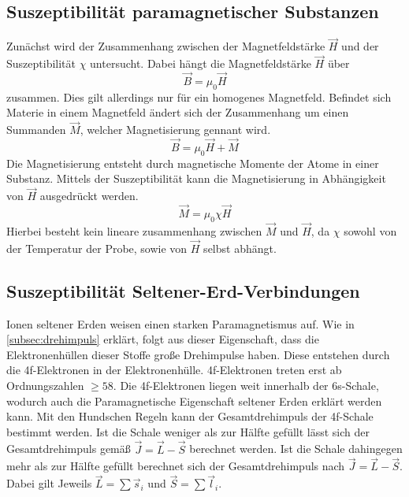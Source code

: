 \subsection{Suszeptibilität paramagnetischer Substanzen}
\label{subsec:Berechnung}

Zunächst wird der Zusammenhang zwischen der Magnetfeldstärke $\vec{H}$ und der Suszeptibilität $\chi$ untersucht. Dabei hängt die Magnetfeldstärke $\vec{H}$ über 
\begin{equation*}
    \vec{B} = \mu_0 \vec{H}
\end{equation*}
zusammen. Dies gilt allerdings nur für ein homogenes Magnetfeld. Befindet sich Materie in einem Magnetfeld ändert sich der Zusammenhang um einen Summanden $\vec{M}$, welcher 
Magnetisierung gennant wird.
\begin{equation}
    \label{eqn:magnetfeld}
    \vec{B} = \mu_0 \vec{H} + \vec{M}
\end{equation}
Die Magnetisierung entsteht durch magnetische Momente der Atome in einer Substanz. Mittels der Suszeptibilität kann die Magnetisierung in Abhängigkeit von $\vec{H}$
ausgedrückt werden. 
\begin{equation}
    \label{eqn:Mchi}
    \vec{M} = \mu_0 \chi \vec{H}
\end{equation}
Hierbei besteht kein lineare zusammenhang zwischen $\vec{M}$ und $\vec{H}$, da $\chi$ sowohl von der Temperatur der Probe, sowie von $\vec{H}$ selbst abhängt.

\subsection{Suszeptibilität Seltener-Erd-Verbindungen}
\label{subsec:suzepseltenererden}
Ionen seltener Erden weisen einen starken Paramagnetismus auf. Wie in \autoref{subsec:drehimpuls} erklärt, folgt aus dieser Eigenschaft, dass die Elektronenhüllen dieser Stoffe
große Drehimpulse haben. Diese entstehen durch die 4f-Elektronen in der Elektronenhülle. 4f-Elektronen treten erst ab Ordnungszahlen $\geq 58$. Die 4f-Elektronen liegen weit
innerhalb der 6s-Schale, wodurch auch die Paramagnetische Eigenschaft seltener Erden erklärt werden kann. Mit den Hundschen Regeln kann der Gesamtdrehimpuls der 4f-Schale
bestimmt werden. Ist die Schale weniger als zur Hälfte gefüllt lässt sich der Gesamtdrehimpuls gemäß $\vec{J} = \vec{L} - \vec{S}$ berechnet werden. Ist die Schale dahingegen 
mehr als zur Hälfte gefüllt berechnet sich der Gesamtdrehimpuls nach $\vec{J} = \vec{L} - \vec{S}$. Dabei gilt Jeweils $\vec{L} = \sum \vec{s}_i$ und $\vec{S} = \sum \vec{l}_i$. 

